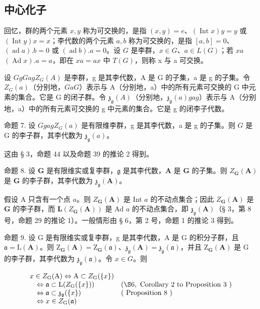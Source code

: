 \subsection{中心化子}

回忆，群的两个元素 \(x, y\) 称为可交换的，是指 \((x, y) = e\)、\((\operatorname{Int} x)y = y\) 或 \((\operatorname{Int} y)x = x\)；李代数的两个元素 \(a, b\) 称为可交换的，是指 \([a, b] = 0\)、\((\operatorname{ad} a).b = 0\) 或 \((\operatorname{ad} b).a = 0\)。设 \(G\) 是李群，\(x \in G\)、\(a \in L(G)\)；若 \(x\)\(a\)\((\operatorname{Ad} x).a = a\)，即在 \(xa = ax\) 中 \(T(G)\)，则称 x 与 a 可交换。

设 \(G\)\(g\)\(G\)\(a\)\(g\)\(Z_{G}(A)\) 是李群，g 是其李代数，A 是 G 的子集，a 是 g 的子集。令 \(Z_{G}(a)\)（分别地，\(G\)\(a\)\(G\)）表示与 A（分别地，a）中的所有元素可交换的 G 中元素的集合。它是 G 的闭子群。令 \(\mathfrak{z}_{\mathfrak{g}}(A)\)（分别地，\(\mathfrak{z}_{\mathfrak{g}}(a)\)\(g\)\(a\)\(g\)）表示与 A（分别地，a）中的所有元素可交换的 g 中元素的集合。它是 g 的闭李子代数。

命题 7. 设 \(G\)\(g\)\(a\)\(g\)\(Z_G(a)\) 是有限维李群，g 是其李代数，a 是 g 的子集。则 \(G\) 是 G 的李子群，其李代数为 \(\mathfrak{z}_{\mathfrak{g}}(a)\)。

这由 § 3，命题 44 以及命题 39 的推论 2 得到。

命题 8. 设 \(\mathbf{G}\) 是有限维实或复李群，\(\mathfrak{g}\) 是其李代数，\(\mathbf{A}\) 是 \(\mathbf{G}\) 的子集。则 \(Z_{\mathbf{G}}(\mathbf{A})\) 是 \(\mathbf{G}\) 的李子群，其李代数为 \(\mathfrak{z}_{\mathfrak{g}}(\mathbf{A})\)。

假设 A 只含有一个点 \(a\)。则 \(Z_{\mathbf{G}}(\mathbf{A})\) 是 Int \(a\) 的不动点集合；因此 \(Z_{\mathbf{G}}(\mathbf{A})\) 是 \(\mathbf{G}\) 的李子群，而 \(\mathbf{L}(Z_{\mathbf{G}}(\mathbf{A}))\) 是 Ad \(a\) 的不动点集合，即 \(\mathfrak{z}_{\mathfrak{g}}(\mathbf{A})\)（§ 3，第 8 号，命题 29 的推论 1）。一般情形由 § 6，第 2 号，命题 1 的推论 3 得到。

命题 9. 设 G 是有限维实或复李群，g 是其李代数，A 是 G 的积分子群，且 \(\mathfrak{a} = \mathrm{L}(\mathbf{A})\)。则 \(\mathrm{Z}_{\mathbf{G}}(\mathbf{A}) = \mathrm{Z}_{\mathbf{G}}(\mathfrak{a})\)、\(\mathfrak{z}_{\mathfrak{g}}(\mathbf{A}) = \mathfrak{z}_{\mathfrak{g}}(\mathfrak{a})\)，并且 \(\mathrm{Z}_{\mathbf{G}}(\mathbf{A})\) 是 G 的李子群，其李代数为 \(\mathfrak{z}_{\mathfrak{g}}(\mathfrak{a})\)。令 \(x \in G\)。则

\[
\begin{array}{l l} x \in Z _ {\mathrm{G}} (\mathrm{A}) \Leftrightarrow \mathrm{A} \subset Z _ {\mathrm{G}} (\{x \}) \\ \quad \Leftrightarrow \mathfrak {a} \subset \mathrm{L} (Z _ {\mathrm{G}} (\{x \})) & (\S 6, \text { Corollary   2   to   Proposition   3 }) \\ \quad \Leftrightarrow \mathfrak {a} \subset \mathfrak {z}_ {\mathfrak {g}} (\{x \}) & (\text { Proposition   8 }) \\ \quad \Leftrightarrow x \in Z _ {\mathrm{G}} (\mathfrak {a}) \end{array}
\]

